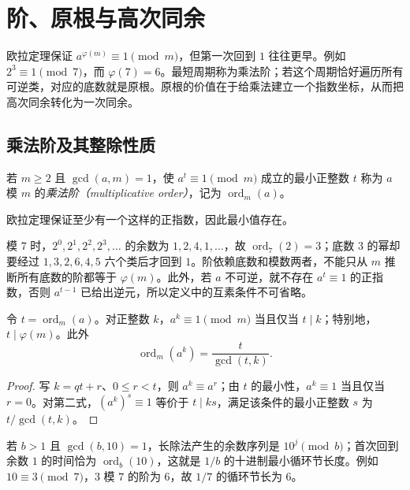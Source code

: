 \setcounter{chapter}{7} %
\chapter{阶、原根与高次同余}
\label{ch:primitive-roots}

欧拉定理保证 $a^{\varphi(m)}\equiv1\pmod m$，但第一次回到 $1$ 往往更早。例如 $2^3\equiv1\pmod7$，而 $\varphi(7)=6$。最短周期称为乘法阶；若这个周期恰好遍历所有可逆类，对应的底数就是原根。原根的价值在于给乘法建立一个指数坐标，从而把高次同余转化为一次同余。

\section{乘法阶及其整除性质}

\begin{definition}
若 $m\ge2$ 且 $\gcd(a,m)=1$，使 $a^t\equiv1\pmod m$ 成立的最小正整数 $t$ 称为 $a$ 模 $m$ 的\emph{乘法阶（multiplicative order）}，记为 $\operatorname{ord}_m(a)$。
\end{definition}

欧拉定理保证至少有一个这样的正指数，因此最小值存在。

模 $7$ 时，$2^0,2^1,2^2,2^3,\ldots$ 的余数为 $1,2,4,1,\ldots$，故 $\operatorname{ord}_7(2)=3$；底数 $3$ 的幂却要经过 $1,3,2,6,4,5$ 六个类后才回到 $1$。阶依赖底数和模数两者，不能只从 $m$ 推断所有底数的阶都等于 $\varphi(m)$。此外，若 $a$ 不可逆，就不存在 $a^t\equiv1$ 的正指数，否则 $a^{t-1}$ 已给出逆元，所以定义中的互素条件不可省略。

\begin{proposition}
\label{prop:order}
令 $t=\operatorname{ord}_m(a)$。对正整数 $k$，$a^k\equiv1\pmod m$ 当且仅当 $t\mid k$；特别地，$t\mid\varphi(m)$。此外
\begin{equation}
 \operatorname{ord}_m(a^k)=\frac{t}{\gcd(t,k)}.
 \label{eq:order-power}
\end{equation}
\end{proposition}
\begin{proof}
写 $k=qt+r$、$0\le r<t$，则 $a^k\equiv a^r$；由 $t$ 的最小性，$a^k\equiv1$ 当且仅当 $r=0$。对第二式，$(a^k)^s\equiv1$ 等价于 $t\mid ks$，满足该条件的最小正整数 $s$ 为 $t/\gcd(t,k)$。
\end{proof}

若 $b>1$ 且 $\gcd(b,10)=1$，长除法产生的余数序列是 $10^j\pmod b$；首次回到余数 $1$ 的时间恰为 $\operatorname{ord}_b(10)$，这就是 $1/b$ 的十进制最小循环节长度。例如 $10\equiv3\pmod7$，$3$ 模 $7$ 的阶为 $6$，故 $1/7$ 的循环节长为 $6$。

